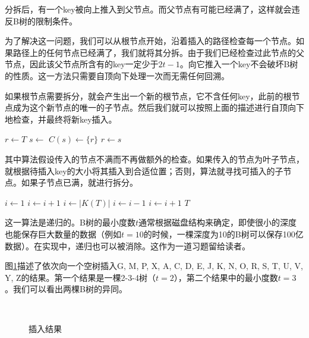 \documentclass{ctexart}
\begin{document}
分拆后，有一个key被向上推入到父节点。而父节点有可能已经满了，这样就会违反B树的限制条件。

为了解决这一问题，我们可以从根节点开始，沿着插入的路径检查每一个节点。如果路径上的任何节点已经满了，我们就将其分拆。由于我们已经检查过此节点的父节点，因此该父节点所含有的key一定少于$2t-1$。向它推入一个key不会破坏B树的性质。这一方法只需要自顶向下处理一次而无需任何回溯。

如果根节点需要拆分，就会产生出一个新的根节点，它不含任何key，此前的根节点成为这个新节点的唯一的子节点。然后我们就可以按照上面的描述进行自顶向下地检查，并最终将新key插入。

\begin{algorithmic}[1]
  \State $r \gets T$
   
    \State $s \gets$ 
    \State $C(s) \gets \{r\}$
    \State {}
    \State $r \gets s$
  \EndIf
  \State \Return {}
\EndFunction
\end{algorithmic}

其中算法假设传入的节点不满而不再做额外的检查。如果传入的节点为叶子节点，就根据待插入key的大小将其插入到合适位置；否则，算法就寻找可插入的子节点。如果子节点已满，就进行拆分。

\begin{algorithmic}[1]
    \State $i \gets 1$
      \State $i \gets i+1$
    \EndWhile
    \State {}
  \Else
    \State $i \gets |K(T)|$
      \State $i \gets i-1$
    \EndWhile
      \State {}
        \State $i \gets i+1$
      \EndIf
    \EndIf
    \State {}
  \EndIf
  \State \Return $T$
\EndFunction
\end{algorithmic}

这一算法是递归的。B树的最小度数$t$通常根据磁盘结构来确定，即使很小的深度也能保存巨大数量的数据（例如$t=10$的时候，一棵深度为10的B树可以保存100亿数据）。在实现中，递归也可以被消除。这作为一道习题留给读者。

图\ref{fig:btree-insert}描述了依次向一个空树插入G, M, P, X, A, C, D, E, J, K, N, O, R, S, T, U, V, Y, Z的结果。第一个结果是一棵2-3-4树（$t=2$），第二个结果中的最小度数$t=3$。我们可以看出两棵B树的异同。

\begin{figure}[htbp]
  \centering
  \\
  \caption{插入结果} \label{fig:btree-insert}
\end{figure}
\end{document}
